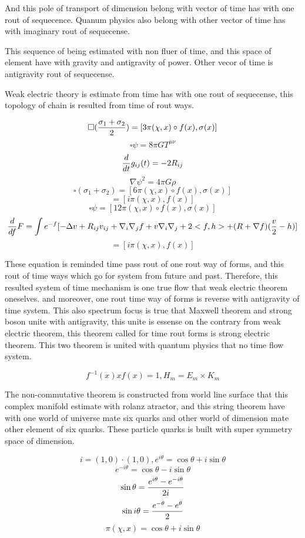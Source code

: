 \documentclass{jsarticle}
\begin{document}
  And this pole of transport of dimension belong with vector of time has 
with one rout of sequecence. Quanum physics also belong with other vector 
of time has with imaginary rout of sequecense.

 This sequence of being estimated with non fluer of time, and this space 
of element have with gravity and antigravity of power.
Other vecor of time is antigravity rout of sequecense.

 Weak electric theory is estimate from time has with one rout of sequecense,
this topology of chain is resulted from time of rout ways.

      $$ \square ({{\sigma_1 + \sigma_2} \over 2 }) = [3 \pi (\chi,x) \circ f(x),
   \sigma(x)] $$
   $$ \square \psi = 8 \pi G T^{\mu\nu} $$
   $$ {d \over dt}g_{ij}(t) = - 2 R_{ij} $$
   $$ \nabla \psi^2 = 4 \pi G \rho $$
   $$ \square (\sigma_1 + \sigma_2) = [6\pi(\chi,x)\circ f(x), \sigma(x)] $$
   $$ = [i \pi(\chi,x),f(x)] $$
   $$ \square \psi = [12 \pi (\chi,x)\circ f(x), \sigma(x)] $$
   $$ {d \over df} F = \int e^{-f}[- \Delta v + R_{ij} v_{ij}+ 
   \nabla_i \nabla_j f  + v \nabla_i \nabla_j + 2<f,h> + (R + \nabla f)
   ({v \over 2} - h) ] $$
   $$ =[i \pi(\chi,x), f(x)] $$

   These equation is reminded time pass rout of one rout way of forms,
   and this rout of time ways which go for system from future and past.
   Therefore, this resulted system of time mechanism is one true flow
   that weak electric theorem oneselves.
   and moreover, one rout time way of forms is reverse with antigravity of
   time system. This also spectrum focus is true that Maxwell theorem and
   strong boson unite with antigravity, this unite is essense on the contrary
   from weak electric theorem, this theorem called for time rout forms is
   strong electric theorem.
   This two theorem is united with quantum physics that no time flow system.

   $$ f^{-1}(x)xf(x) = 1,H_m = E_m \times K_m $$


   The non-commutative theorem is constructed from world line surface that
   this complex manifold estimate with rolanz atractor, and this string
   theorem have with one world of universe mate six quarks and other world of
   dimension mate other element of six quarks.
   These particle quarks is built with super symmetry space of dimension.

   $$ i = (1,0)\cdot (1,0), e^{i\theta} = \cos \theta + i \sin \theta $$
   $$ e^{-i \theta} = \cos \theta - i\sin \theta $$
   $$ \sin \theta = {e^{i \theta} - e^{-i \theta} \over 2i} $$
   $$ \sin i \theta = {e^{-\theta} - e^{\theta} \over 2} $$
   $$ \pi (\chi,x) = \cos \theta + i \sin \theta $$
\end{document}
